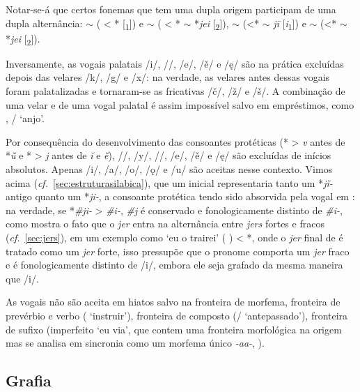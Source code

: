 Notar-se-á que certos fonemas que tem uma dupla origem participam de uma dupla
alternância:  $\sim$  ( < *
[\textsubscript{1}]) e  $\sim$  ( <
* $\sim$ *\emph{jei} [\textsubscript{2}]), 
$\sim$  (<* $\sim$ \emph{jī} [\emph{i}\textsubscript{1}]) e
 $\sim$  (<* $\sim$ *\emph{jei}
[\textsubscript{2}]).

Inversamente, as vogais palatais /i/, /\jeri{}/, /e/, /ě/ e /ę/ são na
prática excluídas depois das velares /k/, /g/ e /x/: na verdade, as velares
antes dessas vogais foram palatalizadas e tornaram-se as fricativas /č/, /ž/ e
/š/.
A combinação de uma velar e de uma vogal palatal é assim impossível salvo em
empréstimos, como , \slash{} `anjo'.

Por consequência do desenvolvimento das consoantes protéticas (* >
\emph{v} antes de  *\emph{ū̆} e * > \emph{j} antes de  \emph{ĭ} e
\emph{ē̆}), /\jeru{}/, /y/, /\jeri{}/, /e/, /ě/ e /ę/ são excluídas de
inícios absolutos.
Apenas /i/, /a/, /o/, /ǫ/ e /u/ são aceitas nesse contexto.
Vimos acima (\emph{cf.}~\ref{sec:estruturasilabica}), que um  inicial
representaria tanto um *\emph{jĭ-} antigo quanto um *\emph{ji-}, a consoante
protética tendo sido absorvida pela vogal em : na verdade, se
*\emph{\#ji-} > \emph{\#i-}, \emph{\#j\jeri{}} é conservado e
fonologicamente distinto de \emph{\#i-}, como mostra o fato que o \emph{jer}
entra na alternância entre \emph{jers} fortes e fracos
(\emph{cf.}~\ref{sec:jers}), em um exemplo como  `eu o trairei'
( ) < *, onde o
\emph{jer} final de  é tratado como um \emph{jer} forte, isso
pressupõe que o pronome  comporta um \emph{jer} fraco e é
fonologicamente distinto de /i/, embora ele seja grafado da mesma maneira que
/i/.

As vogais não são aceita em hiatos salvo na fronteira de morfema, fronteira de
prevérbio e verbo ( `instruir'),
fronteira de composto (\slash{}
`antepassado'), fronteira de sufixo (imperfeito
 `eu via', que contem uma fronteira
morfológica na origem mas se analisa em sincronia como um morfema único
\emph{-aa-}, ).


\subsection{Grafia}

